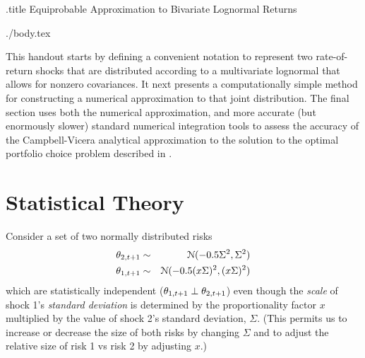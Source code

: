 \documentclass{handout}
\begin{document}
\large

\handoutHeader

\begin{verbatimwrite}{\jobname.title}
Equiprobable Approximation to Bivariate Lognormal Returns
\end{verbatimwrite}

\handoutNameMake


\begin{verbatimwrite}{./body.tex}
  \newcommand{\sigAll}{\Sigma} %
  
\newcommand{\scale}{x}

This handout starts by defining a convenient notation to represent two rate-of-return shocks
that are distributed according to a multivariate lognormal that allows
for nonzero covariances.  It next presents a computationally
simple method for constructing a numerical approximation to that joint distribution.  The final
section uses both the numerical approximation, and more accurate (but enormously slower) standard numerical integration tools to assess the accuracy of the Campbell-Vicera analytical approximation to the solution to the optimal portfolio choice problem
described in .  

\section{Statistical Theory}

Consider a set of two normally distributed risks
\begin{equation*}\begin{gathered}\begin{aligned}
   \ShkMeanOneLog_{2,t+1} & \sim & \mathcal{N}(-0.5 \sigAll^{2},\sigAll^{2})
\\ \ShkMeanOneLog_{1,t+1} & \sim & \mathcal{N}(-0.5 (\scale \sigAll)^{2},(\scale \sigAll)^{2})
\end{aligned}\end{gathered}\end{equation*}
which are statistically independent ($\theta_{1,t+1} \perp \theta_{2,t+1}$) even though the {\it scale} of shock 1's
{\it standard deviation} is determined by the proportionality factor
$\scale$ multiplied by the value of shock 2's standard deviation,
$\sigAll$.  (This permits us to increase or decrease the size of both risks
by changing $\sigAll$ and to adjust the relative size of risk 1 vs risk 2 by adjusting $\scale$.)


\end{verbatimwrite}
\end{document}
